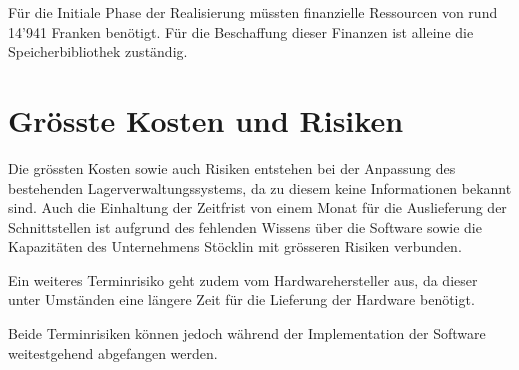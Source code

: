 Für die Initiale Phase der Realisierung müssten finanzielle Ressourcen von rund 14'941 Franken benötigt. Für die Beschaffung dieser Finanzen ist alleine die Speicherbibliothek zuständig.

\section{Grösste Kosten und Risiken}
Die grössten Kosten sowie auch Risiken entstehen bei der Anpassung des bestehenden Lagerverwaltungssystems, da zu diesem keine Informationen bekannt sind. Auch die Einhaltung der Zeitfrist von einem Monat für die Auslieferung der Schnittstellen ist aufgrund des fehlenden Wissens über die Software sowie die Kapazitäten des Unternehmens Stöcklin mit grösseren Risiken verbunden.

Ein weiteres Terminrisiko geht zudem vom Hardwarehersteller aus, da dieser unter Umständen eine längere Zeit für die Lieferung der Hardware benötigt.

Beide Terminrisiken können jedoch während der Implementation der Software weitestgehend abgefangen werden.
